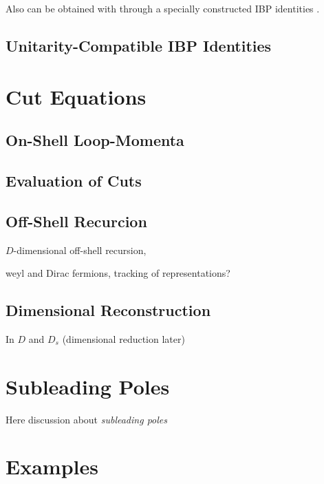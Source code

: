 Also can be obtained with through a specially constructed IBP identities \cite{Ita:2015tya}.


\subsection{Unitarity-Compatible IBP Identities}

\section{Cut Equations}

\subsection{On-Shell Loop-Momenta}


\subsection{Evaluation of Cuts}

\subsection{Off-Shell Recurcion}
\label{sec:BG_recursion}

$D$-dimensional off-shell recursion, 


weyl and Dirac fermions, 
tracking of representations?


\subsection{Dimensional Reconstruction}
 In $D$ and $D_s$ (dimensional reduction later)


\section{Subleading Poles}
Here discussion about \textit{subleading poles}



\section{Examples}

